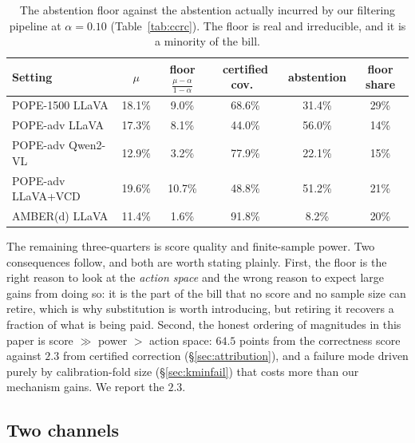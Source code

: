 \documentclass{article}
\theoremstyle{plain}
\theoremstyle{definition}
\theoremstyle{remark}
\begin{document}
\begin{table}[t]
\centering
\caption{The abstention floor against the abstention actually incurred by our filtering
pipeline at $\alpha=0.10$ (Table~\ref{tab:ccrc}). The floor is real and irreducible, and it is
a minority of the bill.}
\label{tab:floorbite}
\small
\begin{tabular}{lccccc}
\toprule
Setting & $\mu$ & floor $\frac{\mu-\alpha}{1-\alpha}$ & certified cov.\ & abstention
& floor share\\
\midrule
POPE-1500 LLaVA    & 18.1\% & 9.0\%  & 68.6\% & 31.4\% & 29\%\\
POPE-adv LLaVA     & 17.3\% & 8.1\%  & 44.0\% & 56.0\% & 14\%\\
POPE-adv Qwen2-VL  & 12.9\% & 3.2\%  & 77.9\% & 22.1\% & 15\%\\
POPE-adv LLaVA+VCD & 19.6\% & 10.7\% & 48.8\% & 51.2\% & 21\%\\
AMBER(d) LLaVA     & 11.4\% & 1.6\%  & 91.8\% & 8.2\%  & 20\%\\
\bottomrule
\end{tabular}
\end{table}

The remaining three-quarters is score quality and finite-sample power. Two consequences follow,
and both are worth stating plainly. First, the floor is the
right reason to look at the \emph{action space} and the wrong reason to expect large gains from
doing so: it is the part of the bill that no score and no sample size can retire, which is why
substitution is worth introducing, but retiring it recovers a fraction of what is being paid.
Second, the honest ordering of magnitudes in this paper is score $\gg$ power $>$ action space:
$64.5$ points from the correctness score against $2.3$ from certified correction
(\S\ref{sec:attribution}), and a failure mode driven purely by calibration-fold size
(\S\ref{sec:kminfail}) that costs more than our mechanism gains. We report the $2.3$.

\subsection{Two channels}
\end{document}

